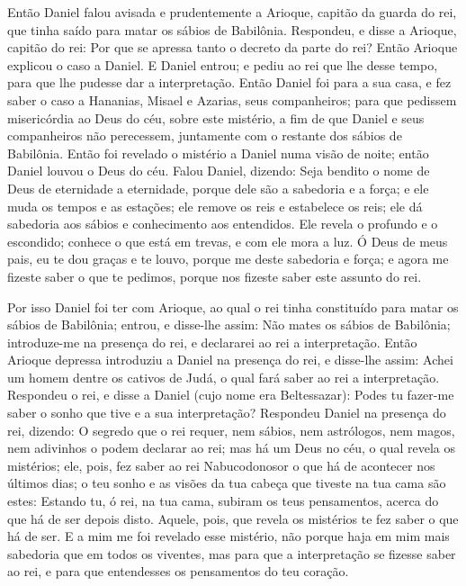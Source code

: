 Então Daniel falou avisada e prudentemente a Arioque, capitão da
guarda do rei, que tinha saído para matar os sábios de Babilônia.
Respondeu, e disse a Arioque, capitão do rei: Por que se
apressa tanto o decreto da parte do rei? Então Arioque explicou o
caso a Daniel. E Daniel entrou; e pediu ao rei que lhe desse
tempo, para que lhe pudesse dar a interpretação. Então Daniel
foi para a sua casa, e fez saber o caso a Hananias, Misael e
Azarias, seus companheiros; para que pedissem misericórdia ao
Deus do céu, sobre este mistério, a fim de que Daniel e seus
companheiros não perecessem, juntamente com o restante dos sábios de
Babilônia. Então foi revelado o mistério a Daniel numa visão
de noite; então Daniel louvou o Deus do céu. Falou Daniel,
dizendo: Seja bendito o nome de Deus de eternidade a eternidade,
porque dele são a sabedoria e a força; e ele muda os tempos e
as estações; ele remove os reis e estabelece os reis; ele dá
sabedoria aos sábios e conhecimento aos entendidos. Ele
revela o profundo e o escondido; conhece o que está em trevas, e com
ele mora a luz. Ó Deus de meus pais, eu te dou graças e te
louvo, porque me deste sabedoria e força; e agora me fizeste saber o
que te pedimos, porque nos fizeste saber este assunto do rei.

Por isso Daniel foi ter com Arioque, ao qual o rei tinha
constituído para matar os sábios de Babilônia; entrou, e disse-lhe
assim: Não mates os sábios de Babilônia; introduze-me na presença do
rei, e declararei ao rei a interpretação. Então Arioque
depressa introduziu a Daniel na presença do rei, e disse-lhe assim:
Achei um homem dentre os cativos de Judá, o qual fará saber ao rei a
interpretação. Respondeu o rei, e disse a Daniel (cujo nome
era Beltessazar): Podes tu fazer-me saber o sonho que tive e a sua
interpretação? Respondeu Daniel na presença do rei, dizendo:
O segredo que o rei requer, nem sábios, nem astrólogos, nem magos,
nem adivinhos o podem declarar ao rei; mas há um Deus no céu,
o qual revela os mistérios; ele, pois, fez saber ao rei
Nabucodonosor o que há de acontecer nos últimos dias; o teu sonho e
as visões da tua cabeça que tiveste na tua cama são estes:
Estando tu, ó rei, na tua cama, subiram os teus pensamentos,
acerca do que há de ser depois disto. Aquele, pois, que revela os
mistérios te fez saber o que há de ser. E a mim me foi
revelado esse mistério, não porque haja em mim mais sabedoria que em
todos os viventes, mas para que a interpretação se fizesse saber ao
rei, e para que entendesses os pensamentos do teu coração.

